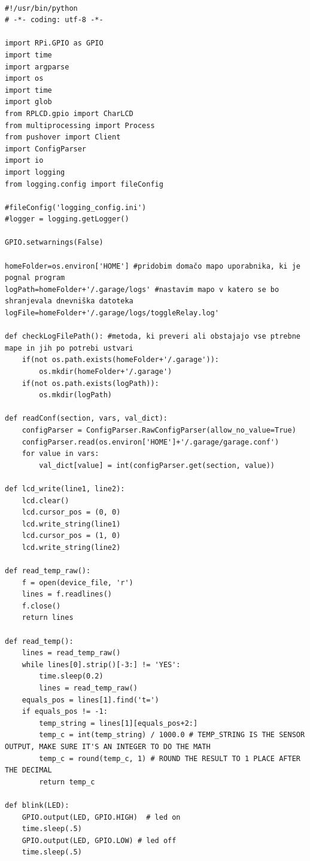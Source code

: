 \documentclass[11pt]{article}
\begin{document}
\begin{verbatim}

#!/usr/bin/python
# -*- coding: utf-8 -*-

import RPi.GPIO as GPIO
import time
import argparse
import os
import time
import glob
from RPLCD.gpio import CharLCD
from multiprocessing import Process
from pushover import Client
import ConfigParser
import io
import logging
from logging.config import fileConfig

#fileConfig('logging_config.ini')
#logger = logging.getLogger()

GPIO.setwarnings(False)

homeFolder=os.environ['HOME'] #pridobim domačo mapo uporabnika, ki je pognal program
logPath=homeFolder+'/.garage/logs' #nastavim mapo v katero se bo shranjevala dnevniška datoteka
logFile=homeFolder+'/.garage/logs/toggleRelay.log'

def checkLogFilePath(): #metoda, ki preveri ali obstajajo vse ptrebne mape in jih po potrebi ustvari
    if(not os.path.exists(homeFolder+'/.garage')):
        os.mkdir(homeFolder+'/.garage')
    if(not os.path.exists(logPath)):
        os.mkdir(logPath)

def readConf(section, vars, val_dict):
    configParser = ConfigParser.RawConfigParser(allow_no_value=True)
    configParser.read(os.environ['HOME']+'/.garage/garage.conf')
    for value in vars:
        val_dict[value] = int(configParser.get(section, value))

def lcd_write(line1, line2):
    lcd.clear()
    lcd.cursor_pos = (0, 0)
    lcd.write_string(line1)
    lcd.cursor_pos = (1, 0)
    lcd.write_string(line2)

def read_temp_raw():
    f = open(device_file, 'r')
    lines = f.readlines()
    f.close()
    return lines

def read_temp():
    lines = read_temp_raw()
    while lines[0].strip()[-3:] != 'YES':
        time.sleep(0.2)
        lines = read_temp_raw()
    equals_pos = lines[1].find('t=')
    if equals_pos != -1:
        temp_string = lines[1][equals_pos+2:]
        temp_c = int(temp_string) / 1000.0 # TEMP_STRING IS THE SENSOR OUTPUT, MAKE SURE IT'S AN INTEGER TO DO THE MATH
        temp_c = round(temp_c, 1) # ROUND THE RESULT TO 1 PLACE AFTER THE DECIMAL
        return temp_c

def blink(LED):
    GPIO.output(LED, GPIO.HIGH)  # led on
    time.sleep(.5)
    GPIO.output(LED, GPIO.LOW) # led off
    time.sleep(.5)


\end{verbatim}
\end{document}
